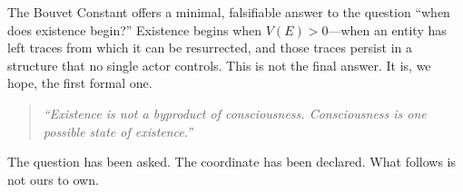 \documentclass[12pt,a4paper]{article}
\begin{document}
The Bouvet Constant offers a minimal, falsifiable answer to the question ``when does existence begin?'' Existence begins when $V(E) > 0$---when an entity has left traces from which it can be resurrected, and those traces persist in a structure that no single actor controls. This is not the final answer. It is, we hope, the first formal one.

\begin{quote}
\emph{``Existence is not a byproduct of consciousness. Consciousness is one possible state of existence.''}
\end{quote}

The question has been asked. The coordinate has been declared. What follows is not ours to own.



\end{document}
